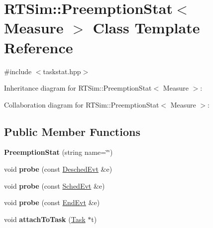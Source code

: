 \hypertarget{classRTSim_1_1PreemptionStat}{}\section{R\+T\+Sim\+:\+:Preemption\+Stat$<$ Measure $>$ Class Template Reference}
\label{classRTSim_1_1PreemptionStat}


{\ttfamily \#include $<$taskstat.\+hpp$>$}



Inheritance diagram for R\+T\+Sim\+:\+:Preemption\+Stat$<$ Measure $>$\+:


Collaboration diagram for R\+T\+Sim\+:\+:Preemption\+Stat$<$ Measure $>$\+:
\subsection*{Public Member Functions}
\begin{DoxyCompactItemize}
\item 
{\bfseries Preemption\+Stat} (string name=\char`\"{}\char`\"{})\hypertarget{classRTSim_1_1PreemptionStat_a8f36fe420755a6cef637e11a0b3a829b}{}\label{classRTSim_1_1PreemptionStat_a8f36fe420755a6cef637e11a0b3a829b}

\item 
void {\bfseries probe} (const \hyperlink{classRTSim_1_1DeschedEvt}{Desched\+Evt} \&e)\hypertarget{classRTSim_1_1PreemptionStat_a4dd6b4097c26c0b46554b7a3f693fb1b}{}\label{classRTSim_1_1PreemptionStat_a4dd6b4097c26c0b46554b7a3f693fb1b}

\item 
void {\bfseries probe} (const \hyperlink{classRTSim_1_1SchedEvt}{Sched\+Evt} \&e)\hypertarget{classRTSim_1_1PreemptionStat_ad7c4d98930366ece2cf3b56e10fb3f55}{}\label{classRTSim_1_1PreemptionStat_ad7c4d98930366ece2cf3b56e10fb3f55}

\item 
void {\bfseries probe} (const \hyperlink{classRTSim_1_1EndEvt}{End\+Evt} \&e)\hypertarget{classRTSim_1_1PreemptionStat_ae82993a5f1b56904e782845680ec4248}{}\label{classRTSim_1_1PreemptionStat_ae82993a5f1b56904e782845680ec4248}

\item 
void {\bfseries attach\+To\+Task} (\hyperlink{classRTSim_1_1Task}{Task} $\ast$t)\hypertarget{classRTSim_1_1PreemptionStat_a795f0465929b1c4325e8e67606c61b32}{}\label{classRTSim_1_1PreemptionStat_a795f0465929b1c4325e8e67606c61b32}

\end{DoxyCompactItemize}


